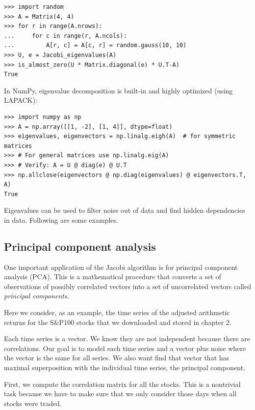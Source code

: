 \documentclass[justified, sixbynine]{tufte-book}
\def\ft{\small\tt}
\theoremstyle{plain}%
\newtheorem * {corollary}{Corollary}
\theoremstyle{definition}
\theoremstyle{remark}
\newtheorem * {remark}{Remark}
\newtheorem * {note}{Note}
\begin{document}
\begin{fullwidth}
\begin{lstlisting}[caption={in file: {\ft nlib.py}}]
>>> import random
>>> A = Matrix(4, 4)
>>> for r in range(A.nrows):
...     for c in range(r, A.ncols):
...         A[r, c] = A[c, r] = random.gauss(10, 10)
>>> U, e = Jacobi_eigenvalues(A)
>>> is_almost_zero(U * Matrix.diagonal(e) * U.T-A)
True
\end{lstlisting}

In NumPy, eigenvalue decomposition is built-in and highly optimized (using LAPACK):

\begin{lstlisting}
>>> import numpy as np
>>> A = np.array([[1, -2], [1, 4]], dtype=float)
>>> eigenvalues, eigenvectors = np.linalg.eigh(A)  # for symmetric matrices
>>> # For general matrices use np.linalg.eig(A)
>>> # Verify: A = U @ diag(e) @ U.T
>>> np.allclose(eigenvectors @ np.diag(eigenvalues) @ eigenvectors.T, A)
True
\end{lstlisting}

Eigenvalues can be used to filter noise out of data and find hidden dependencies in data. Following are some examples.

\goodbreak\subsection{Principal component analysis}


One important application of the Jacobi algorithm is for principal component analysis (PCA). This is a mathematical procedure that converts a set of observations of possibly correlated vectors into a set of uncorrelated vectors called {\it principal components}.

Here we consider, as an example, the time series of the adjusted arithmetic returns for the S\&P100 stocks that we downloaded and stored in chapter 2.

Each time series is a vector. We know they are not independent because there are correlations. Our goal is to model each time series and a vector plus noise where the vector is the same for all series. We also want find that vector that has maximal superposition with the individual time series, the principal component.

First, we compute the correlation matrix for all the stocks. This is a nontrivial task because we have to make sure that we only consider those days when all stocks were traded. %


\end{fullwidth}
\end{document}
